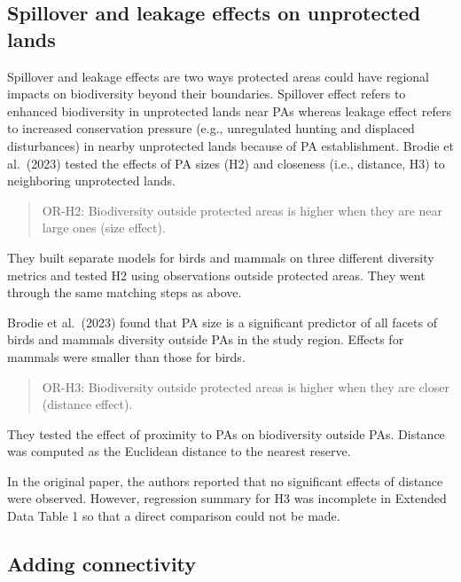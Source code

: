 \documentclass[
]{article}
\begin{document}
\hypertarget{spillover-and-leakage-effects-on-unprotected-lands}{%
\subsection{Spillover and leakage effects on unprotected
lands}\label{spillover-and-leakage-effects-on-unprotected-lands}}

Spillover and leakage effects are two ways protected areas could have
regional impacts on biodiversity beyond their boundaries. Spillover
effect refers to enhanced biodiversity in unprotected lands near PAs
whereas leakage effect refers to increased conservation pressure (e.g.,
unregulated hunting and displaced disturbances) in nearby unprotected
lands because of PA establishment. Brodie et al.~(2023) tested the
effects of PA sizes (H2) and closeness (i.e., distance, H3) to
neighboring unprotected lands.

\begin{quote}
OR-H2: Biodiversity outside protected areas is higher when they are near
large ones (size effect).
\end{quote}

They built separate models for birds and mammals on three different
diversity metrics and tested H2 using observations outside protected
areas. They went through the same matching steps as above.

Brodie et al.~(2023) found that PA size is a significant predictor of
all facets of birds and mammals diversity outside PAs in the study
region. Effects for mammals were smaller than those for birds.

\begin{quote}
OR-H3: Biodiversity outside protected areas is higher when they are
closer (distance effect).
\end{quote}

They tested the effect of proximity to PAs on biodiversity outside PAs.
Distance was computed as the Euclidean distance to the nearest reserve.

In the original paper, the authors reported that no significant effects
of distance were observed. However, regression summary for H3 was
incomplete in Extended Data Table 1 so that a direct comparison could
not be made.

\hypertarget{adding-connectivity}{%
\subsection{Adding connectivity}\label{adding-connectivity}}
\end{document}
